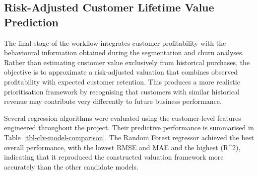 \documentclass[
  12pt,
  letterpaper,
]{book}
\begin{document}
\subsection{Risk-Adjusted Customer Lifetime Value
Prediction}\label{risk-adjusted-customer-lifetime-value-prediction-1}

The final stage of the workflow integrates customer profitability with
the behavioural information obtained during the segmentation and churn
analyses. Rather than estimating customer value exclusively from
historical purchases, the objective is to approximate a risk-adjusted
valuation that combines observed profitability with expected customer
retention. This produces a more realistic prioritisation framework by
recognising that customers with similar historical revenue may
contribute very differently to future business performance.

Several regression algorithms were evaluated using the customer-level
features engineered throughout the project. Their predictive performance
is summarised in Table~\ref{tbl-clv-model-comparison}. The Random Forest
regressor achieved the best overall performance, with the lowest RMSE
and MAE and the highest (R\^{}2), indicating that it reproduced the
constructed valuation framework more accurately than the other candidate
models.
\end{document}
